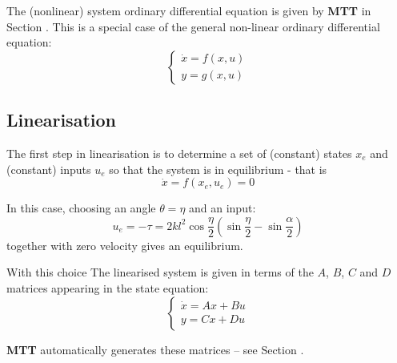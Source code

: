 The (nonlinear) system ordinary differential equation is given by
\textbf{MTT} in Section . This is a
special case of the general non-linear ordinary differential equation:
\begin{equation}
  \label{eq:non-state}
  \begin{cases}
    \dot{x} = f(x,u)\\
    y = g(x,u)
  \end{cases}
\end{equation}

\subsection{Linearisation}
\label{sec:linearisation}

The first step in linearisation is to determine a set of (constant)
states $x_e$ and (constant) inputs $u_e$ so that the system is in
equilibrium - that is
\begin{equation}
  \label{eq:eqilibrium}
 \dot{x} = f(x_e,u_e) = 0
\end{equation}

In this case, choosing an angle $\theta=\eta$ and an input:
\begin{equation}\label{eq:u_e}
  u_e = -\tau = 2kl^2 \cos{\frac{\eta}{2}} (\sin{\frac{\eta}{2}}-\sin{\frac{\alpha}{2}})
\end{equation}
together with zero velocity gives an equilibrium.

With this choice
The linearised system is given in terms of the $A$, $B$, $C$ and $D$
matrices appearing in the state equation:
\begin{equation}
  \label{eq:state}
  \begin{cases}
    \dot{x} = Ax + Bu\\
    y = Cx + Du
  \end{cases}
\end{equation}

\textbf{MTT} automatically generates these matrices -- see Section
.

